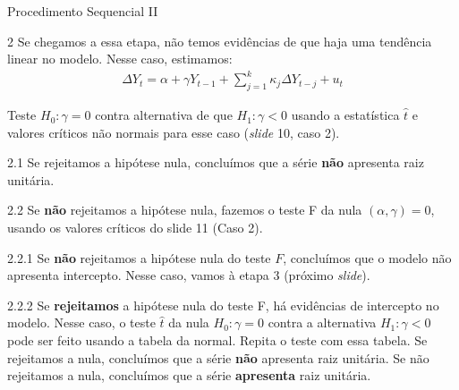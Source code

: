 \documentclass[11pt]{beamer}
\newenvironment{wideenumerate}{\enumerate\addtolength{\itemsep}{10pt}}{\endenumerate}
\newenvironment{halfwideenumerate}{\enumerate\addtolength{\itemsep}{0.5em}}{\endenumerate}
\begin{document}
\begin{frame}{Procedimento Sequencial II}
	\begin{wideenumerate}
		\item[2] Se chegamos a essa etapa, não temos evidências de que haja uma tendência linear no modelo. Nesse caso, estimamos:
		\begin{equation*}
			\begin{aligned}
				\Delta Y_t = \alpha  + \gamma Y_{t-1}  +\sum_{j=1}^k \kappa_j \Delta Y_{t-j} + u_t
			\end{aligned}
		\end{equation*}
		
		Teste $H_0: \gamma = 0$ contra alternativa de que $H_1: \gamma < 0$ usando a estatística $\hat{t}$ e valores críticos não normais para esse caso (\textit{slide} 10, caso 2).
		\begin{halfwideenumerate}
			\item[2.1] Se rejeitamos a hipótese nula, concluímos que a série \textbf{não} apresenta raiz unitária.
			\item[2.2] Se \textbf{não} rejeitamos a hipótese nula, fazemos o teste F da nula $(\alpha, \gamma)=0$, usando os valores críticos do slide 11 (Caso 2).
			\begin{halfwideenumerate}
				\item[2.2.1] Se \textbf{não} rejeitamos a hipótese  nula do teste $F$, concluímos que o modelo não apresenta intercepto. Nesse caso, vamos à etapa 3 (próximo \textit{slide}).
				\item[2.2.2] Se \textbf{rejeitamos} a hipótese nula do teste F, há evidências de intercepto no modelo. Nesse caso, o teste $\hat{t}$ da nula $H_0: \gamma = 0$ contra a alternativa  $H_1: \gamma < 0$ pode ser feito usando a tabela da normal. Repita o teste com essa tabela. Se rejeitamos a nula, concluímos que a série \textbf{não} apresenta raiz unitária. Se não rejeitamos a nula, concluímos que a série \textbf{apresenta} raiz unitária.
			\end{halfwideenumerate}
		\end{halfwideenumerate}
		
	\end{wideenumerate}
	
\end{frame}
\end{document}
